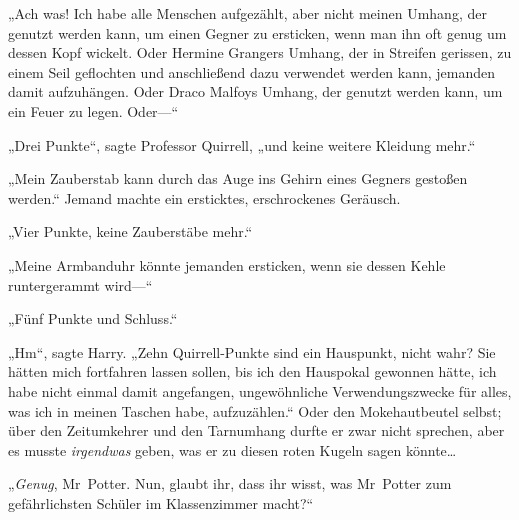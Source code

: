 „Ach was! Ich habe alle Menschen aufgezählt, aber nicht meinen Umhang, der genutzt werden kann, um einen Gegner zu ersticken, wenn man ihn oft genug um dessen Kopf wickelt. Oder Hermine Grangers Umhang, der in Streifen gerissen, zu einem Seil geflochten und anschließend dazu verwendet werden kann, jemanden damit aufzuhängen. Oder Draco Malfoys Umhang, der genutzt werden kann, um ein Feuer zu legen. Oder—“

„Drei Punkte“, sagte Professor Quirrell, „und keine weitere Kleidung mehr.“

„Mein Zauberstab kann durch das Auge ins Gehirn eines Gegners gestoßen werden.“ Jemand machte ein ersticktes, erschrockenes Geräusch.

„Vier Punkte, keine Zauberstäbe mehr.“

„Meine Armbanduhr könnte jemanden ersticken, wenn sie dessen Kehle runtergerammt wird—“

„Fünf Punkte und Schluss.“

„Hm“, sagte Harry. „Zehn Quirrell-Punkte sind ein Hauspunkt, nicht wahr? Sie hätten mich fortfahren lassen sollen, bis ich den Hauspokal gewonnen hätte, ich habe nicht einmal damit angefangen, ungewöhnliche Verwendungszwecke für alles, was ich in meinen Taschen habe, aufzuzählen.“ Oder den Mokehautbeutel selbst; über den Zeitumkehrer und den Tarnumhang durfte er zwar nicht sprechen, aber es musste \emph{irgendwas} geben, was er zu diesen roten Kugeln sagen könnte…

„\emph{Genug}, Mr~Potter. Nun, glaubt ihr, dass ihr wisst, was Mr~Potter zum gefährlichsten Schüler im Klassenzimmer macht?“

